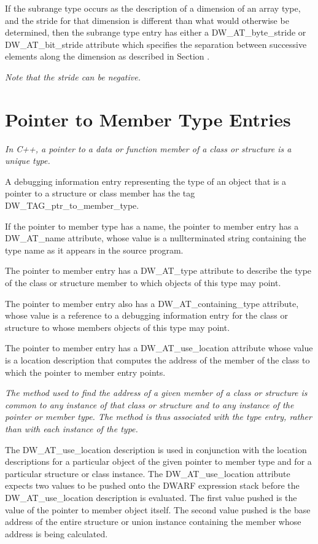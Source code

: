 If the subrange type occurs as the description of a dimension
of an array type, and the stride for that dimension is
different than what would otherwise be determined, then
the subrange type entry has either a DW\_AT\_byte\_stride or
DW\_AT\_bit\_stride attribute which specifies the separation
between successive elements along the dimension as described
in 
Section .

\textit{Note that the stride can be negative.}

\section{Pointer to Member Type Entries}
\label{chap:pointertomembertypeentries}

\textit{In C++, a pointer to a data or function member of a class or
structure is a unique type.}

A debugging information entry representing the type of an
object that is a pointer to a structure or class member has
the tag DW\_TAG\_ptr\_to\_member\_type.

If the pointer to member type has a name, the pointer to
member entry has a DW\_AT\_name attribute, whose value is a
null\dash terminated string containing the type name as it appears
in the source program.

The pointer to member entry has a DW\_AT\_type attribute to
describe the type of the class or structure member to which
objects of this type may point.

The pointer to member entry also has a DW\_AT\_containing\_type
attribute, whose value is a reference to a debugging
information entry for the class or structure to whose members
objects of this type may point.

The pointer to member entry has a DW\_AT\_use\_location attribute
whose value is a location description that computes the
address of the member of the class to which the pointer to
member entry points.

\textit{The method used to find the address of a given member of a
class or structure is common to any instance of that class
or structure and to any instance of the pointer or member
type. The method is thus associated with the type entry,
rather than with each instance of the type.}

The DW\_AT\_use\_location description is used in conjunction
with the location descriptions for a particular object of the
given pointer to member type and for a particular structure or
class instance. The DW\_AT\_use\_location attribute expects two
values to be pushed onto the DWARF expression stack before
the DW\_AT\_use\_location description is evaluated. The first
value pushed is the value of the pointer to member object
itself. The second value pushed is the base address of the
entire structure or union instance containing the member
whose address is being calculated.

